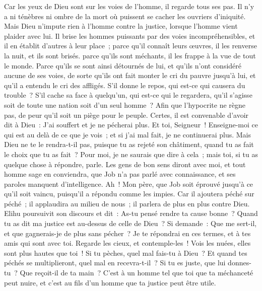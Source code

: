 \begin{multicols}{2}
Car les yeux de Dieu sont sur les voies de l'homme, il regarde tous ses pas.
Il n'y a ni ténèbres ni ombre de la mort où puissent se cacher les ouvriers d'iniquité.
Mais Dieu n'impute rien à l'homme contre la justice, lorsque l'homme vient plaider avec lui. 
Il brise les hommes puissants par des voies incompréhensibles, et il en établit d'autres à leur place~;
parce qu'il connaît leurs œuvres, il les renverse la nuit, et ils sont brisés. 
parce qu'ils sont méchants, il les frappe à la vue de tout le monde.
Parce qu'ils se sont ainsi détournés de lui, et qu'ils n'ont considéré aucune de ses voies,
de sorte qu'ils ont fait monter le cri du pauvre jusqu'à lui, et qu'il a entendu le cri des affligés.
S'il donne le repos, qui est-ce qui causera du trouble~? S'il cache sa face à quelqu'un, qui est-ce qui le regardera, qu'il s'agisse soit de toute une nation soit d'un seul homme~?
Afin que l'hypocrite ne règne pas, de peur qu'il soit un piège pour le peuple.
Certes, il est convenable d'avoir dit à Dieu~: J'ai souffert et je ne pécherai plus.
Et toi, Seigneur~! Enseigne-moi ce qui est au delà de ce que je vois~; et si j'ai mal fait, je ne continuerai plus. 
Mais Dieu ne te le rendra-t-il pas, puisque tu as rejeté son châtiment, quand tu as fait le choix que tu as fait~? Pour moi, je ne saurais que dire à cela~; mais toi, si tu as quelque chose à répondre, parle.
Les gens de bon sens diront avec moi, et tout homme sage en conviendra,
que Job n'a pas parlé avec connaissance, et ses paroles manquent d'intelligence.
Ah~! Mon père, que Job soit éprouvé jusqu'à ce qu'il soit vaincu, puisqu'il a répondu comme les impies.
Car il ajoutera péché sur péché~; il applaudira au milieu de nous~; il parlera de plus en plus contre Dieu.
\VerseOne{}Elihu poursuivit son discours et dit~:
As-tu pensé rendre ta cause bonne~? Quand tu as dit ma justice est au-dessus de celle de Dieu~?
Si demande~: Que me sert-il, et que gagnerais-je de plus sans pécher~?
Je te répondrai en ces termes, et à tes amis qui sont avec toi.
Regarde les cieux, et contemple-les~! Vois les nuées, elles sont plus hautes que toi~!
Si tu pèches, quel mal fais-tu à Dieu~? Et quand tes péchés se multiplieront, quel mal en recevra-t-il~?
Si tu es juste, que lui donnes-tu~? Que reçoit-il de ta main~?
C'est à un homme tel que toi que ta méchanceté peut nuire, et c'est au fils d'un homme que ta justice peut être utile.

\end{multicols}
